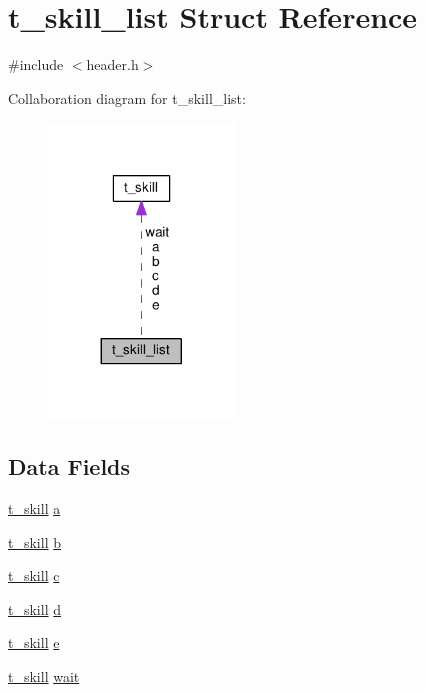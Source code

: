 \hypertarget{structt__skill__list}{\section{t\-\_\-skill\-\_\-list Struct Reference}
\label{structt__skill__list}
}


{\ttfamily \#include $<$header.\-h$>$}



Collaboration diagram for t\-\_\-skill\-\_\-list\-:\nopagebreak
\begin{figure}[H]
\begin{center}
\leavevmode
\includegraphics[width=140pt]{structt__skill__list__coll__graph}
\end{center}
\end{figure}
\subsection*{Data Fields}
\begin{DoxyCompactItemize}
\item 
\hyperlink{structt__skill}{t\-\_\-skill} \hyperlink{structt__skill__list_a39a494bb9ce01ba13ea4577fe2b1cc79}{a}
\item 
\hyperlink{structt__skill}{t\-\_\-skill} \hyperlink{structt__skill__list_a85ae40dbaecefd131b936ec65e9f4809}{b}
\item 
\hyperlink{structt__skill}{t\-\_\-skill} \hyperlink{structt__skill__list_ac9055dd2d5c45c223e3b0e1920c31493}{c}
\item 
\hyperlink{structt__skill}{t\-\_\-skill} \hyperlink{structt__skill__list_a0bb2c4a26ff65aecd7a36ad7ee898cd8}{d}
\item 
\hyperlink{structt__skill}{t\-\_\-skill} \hyperlink{structt__skill__list_aa756d3dbc91762775cff0f4b52526a70}{e}
\item 
\hyperlink{structt__skill}{t\-\_\-skill} \hyperlink{structt__skill__list_a2a4af1a4acb8da6061990f9bd8d0a564}{wait}
\end{DoxyCompactItemize}



